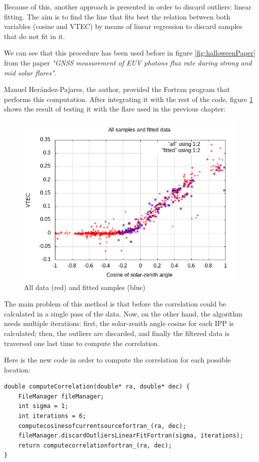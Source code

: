 Because of this, another approach is presented in order to discard outliers: linear fitting. The aim is to find the line that fits best the relation between both variables (cosine and VTEC) by means of linear regression to discard samples that do not fit in it.

We can see that this procedure has been used before in figure \ref{fig:halloweenPaper} from the paper \textit{"GNSS measurement of EUV photons flux rate during strong and mid solar flares"}\cite{hernandez2012gnss}.

Manuel Herández-Pajares, the author, provided the Fortran program that performs this computation. After integrating it with the rest of the code, figure \ref{fig:linearFit} shows the result of testing it with the flare used in the previous chapter:

\begin{figure}[!htb]
	\begin{centering}
	\includegraphics[width=0.5\linewidth]{images/ch6/linearFit/resultAll.png}
		\caption{All data (red) and fitted samples (blue)}
		\label{fig:linearFit}
	\end{centering}
\end{figure}

The main problem of this method is that before the correlation could be calculated in a single pass of the data. Now, on the other hand, the algorithm needs multiple iterations: first, the solar-zenith angle cosine for each IPP is calculated; then, the outliers are discarded, and finally the filtered data is traversed one last time to compute the correlation.

Here is the new code in order to compute the correlation for each possible location:

\begin{minipage}{\linewidth}
\begin{lstlisting}[style=myCStyle, caption=Discarding outliers and computing the correlation]
double computeCorrelation(double* ra, double* dec) {
	FileManager fileManager;
	int sigma = 1;
	int iterations = 6;
	computecosinesofcurrentsourcefortran_(ra, dec);
	fileManager.discardOutliersLinearFitFortran(sigma, iterations);
	return computecorrelationfortran_(ra, dec);
}\end{lstlisting}
\end{minipage}

